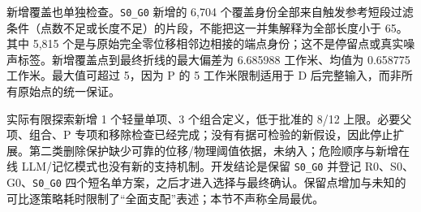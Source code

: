 新增覆盖也单独检查。\texttt{S0\_G0} 新增的 6,704 个覆盖身份全部来自触发参考短段过滤条件（点数不足或长度不足）的片段，不能把这一并集解释为全部长度小于 65。其中 5,815 个是与原始完全零位移相邻边相接的端点身份；这不是停留点或真实噪声标签。新增覆盖点到最终折线的最大偏差为 6.685988 工作米、均值为 0.658775 工作米。最大值可超过 5，因为 P 的 5 工作米限制适用于 D 后完整输入，而非所有原始点的统一保证。

实际有限探索新增 1 个轻量单项、3 个组合定义，低于批准的 8/12 上限。必要父项、组合、P 专项和移除检查已经完成；没有有据可检验的新假设，因此停止扩展。第二类删除保护缺少可靠的位移/物理阈值依据，未纳入；危险顺序与新增在线 LLM/记忆模式也没有新的支持机制。开发结论是保留 \texttt{S0\_G0} 并登记 R0、S0、G0、\texttt{S0\_G0} 四个短名单方案，之后才进入选择与最终确认。保留点增加与未知的可比逐策略耗时限制了“全面支配”表述；本节不声称全局最优。
